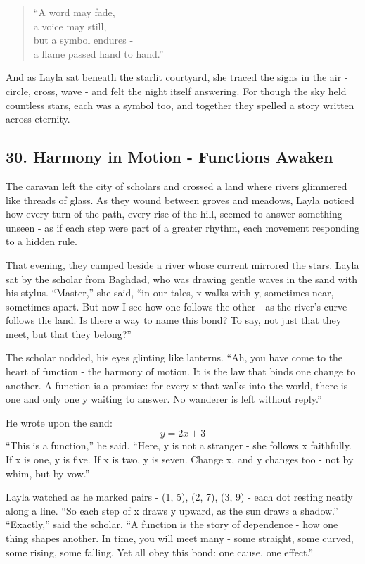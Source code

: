 \documentclass[
  letterpaper,
  DIV=11,
  numbers=noendperiod]{scrreprt}
\begin{document}
\begin{quote}
``A word may fade,\\
a voice may still,\\
but a symbol endures -\\
a flame passed hand to hand.''
\end{quote}

And as Layla sat beneath the starlit courtyard, she traced the signs in
the air - circle, cross, wave - and felt the night itself answering. For
though the sky held countless stars, each was a symbol too, and together
they spelled a story written across eternity.

\subsection{30. Harmony in Motion - Functions
Awaken}\label{harmony-in-motion---functions-awaken}

The caravan left the city of scholars and crossed a land where rivers
glimmered like threads of glass. As they wound between groves and
meadows, Layla noticed how every turn of the path, every rise of the
hill, seemed to answer something unseen - as if each step were part of a
greater rhythm, each movement responding to a hidden rule.

That evening, they camped beside a river whose current mirrored the
stars. Layla sat by the scholar from Baghdad, who was drawing gentle
waves in the sand with his stylus. ``Master,'' she said, ``in our tales,
x walks with y, sometimes near, sometimes apart. But now I see how one
follows the other - as the river's curve follows the land. Is there a
way to name this bond? To say, not just that they meet, but that they
belong?''

The scholar nodded, his eyes glinting like lanterns. ``Ah, you have come
to the heart of function - the harmony of motion. It is the law that
binds one change to another. A function is a promise: for every x that
walks into the world, there is one and only one y waiting to answer. No
wanderer is left without reply.''

He wrote upon the sand: \[
y = 2x + 3
\] ``This is a function,'' he said. ``Here, y is not a stranger - she
follows x faithfully. If x is one, y is five. If x is two, y is seven.
Change x, and y changes too - not by whim, but by vow.''

Layla watched as he marked pairs - (1, 5), (2, 7), (3, 9) - each dot
resting neatly along a line. ``So each step of x draws y upward, as the
sun draws a shadow.'' ``Exactly,'' said the scholar. ``A function is the
story of dependence - how one thing shapes another. In time, you will
meet many - some straight, some curved, some rising, some falling. Yet
all obey this bond: one cause, one effect.''
\end{document}
